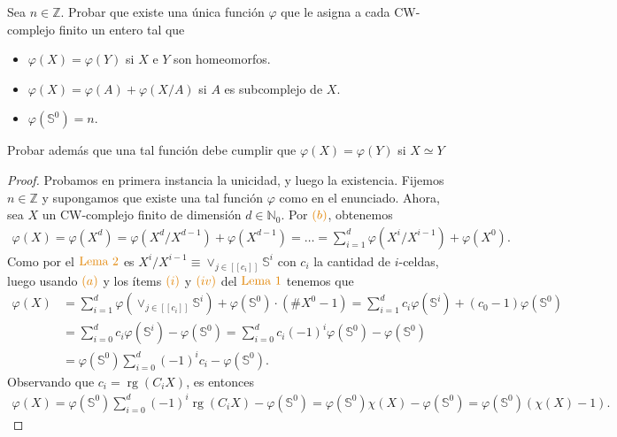 \documentclass[11pt]{article}
\newcommand{\N}{\mathbb{N}}
\newcommand{\Z}{\mathbb{Z}}
\newcommand{\Ss}{\mathbb{S}}
\newcommand{\nat}[1]{[\![#1]\!]}
\newcommand{\paint}[2]{\color{#1}{#2}}
\newenvironment{exercise}[2][Ejercicio]{\begin{trivlist}
\item[\hskip \labelsep \paint{orange}{{\bfseries #1}}\hskip \labelsep {\bfseries #2.}]}{\end{trivlist}}
\begin{document}
\begin{exercise}{8} Sea $n \in \Z$. Probar que existe una \'unica funci\'on $\varphi$ que le asigna a cada CW-complejo finito un entero tal que 
\begin{itemize}
\item[(a)] $\varphi(X) = \varphi(Y)$ si $X$ e $Y$ son homeomorfos.
\item[(b)] $\varphi(X) = \varphi(A) + \varphi(X/A)$ si $A$ es subcomplejo de $X$.
\item[(c)] $\varphi(\Ss^0) = n$.
\end{itemize}
Probar adem\'as que una tal funci\'on debe cumplir que $\varphi(X) = \varphi(Y)$ si $X \simeq Y$

\end{exercise}
\begin{proof} Probamos en primera instancia la unicidad, y luego la existencia. Fijemos $n \in \Z$ y supongamos que existe una tal funci\'on $\varphi$ como en el enunciado. Ahora, sea $X$ un CW-complejo finito de dimensi\'on $d \in \N_0$. Por $\paint{orange}{(b)}$, obtenemos
\begin{align*}
\varphi(X) = \varphi(X^d) = \varphi(X^d/X^{d-1}) + \varphi(X^{d-1}) = \dots = \sum_{i=1}^d\varphi(X^i/X^{i-1}) + \varphi(X^0).
\end{align*}
Como por el $\paint{orange}{\text{Lema $2$}}$ es $X^i/X^{i-1} \equiv \vee_{j \in \nat{c_i}}\Ss^i$ con $c_i$ la cantidad de $i$-celdas, luego usando $\paint{orange}{(a)}$ y los \'items $\paint{orange}{(i)}$ y $\paint{orange}{(iv)}$ del $\paint{orange}{\text{Lema $1$}}$ tenemos que
\begin{align*}
\varphi(X) &= \sum_{i=1}^d \varphi(\vee_{j \in \nat{c_i}}\Ss^i) + \varphi(\Ss^0) \cdot (\#X^0-1) = \sum_{i=1}^d c_i\varphi(\Ss^i) + (c_0-1)\varphi(\Ss^0)\\
&= \sum_{i=0}^dc_i \varphi(\Ss^i) - \varphi(\Ss^0) = \sum_{i=0}^dc_i(-1)^i\varphi(\Ss^0) -\varphi(\Ss^0)\\
& = \varphi(\Ss^0)\sum_{i=0}^d(-1)^ic_i - \varphi(\Ss^0).
\end{align*}
Observando que $c_i = \operatorname{rg}(C_iX)$, es entonces
\begin{align*}
\varphi(X) = \varphi(\Ss^0)\sum_{i=0}^d(-1)^i\operatorname{rg}(C_iX) - \varphi(\Ss^0) = \varphi(\Ss^0) \chi(X) - \varphi(\Ss^0) = \varphi(\Ss^0)(\chi(X)-1).
\end{align*}

\end{proof}
\end{document}
